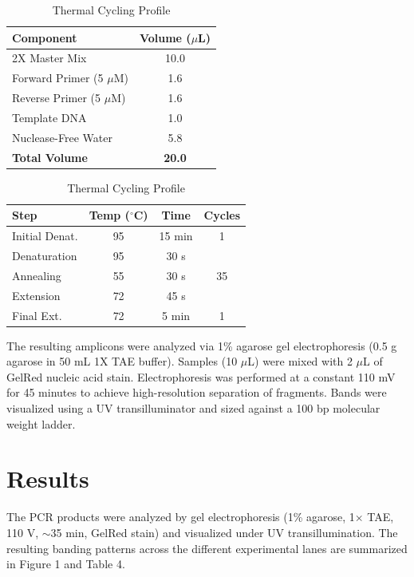 \documentclass[a4paper]{article}
\begin{document}
\begin{table}[h!]
\centering
\begin{minipage}{0.45\textwidth}
\centering
\caption{PCR Reaction Components}
\label{tab:pcr_mix}
\begin{tabular}{@{}lc@{}}
\toprule
\textbf{Component} & \textbf{Volume ($\mu$L)} \\ \midrule
2X Master Mix      & 10.0                     \\
Forward Primer (5 $\mu$M) & 1.6                      \\
Reverse Primer (5 $\mu$M) & 1.6                      \\
Template DNA       & 1.0                      \\
Nuclease-Free Water & 5.8                      \\ \midrule
\textbf{Total Volume} & \textbf{20.0}            \\ \bottomrule
\end{tabular}
\end{minipage}
\hfill
\begin{minipage}{0.45\textwidth}
\centering
\caption{Thermal Cycling Profile}
\label{tab:pcr_cycle}
\begin{tabular}{@{}lccc@{}}
\toprule
\textbf{Step} & \textbf{Temp ($^\circ$C)} & \textbf{Time} & \textbf{Cycles} \\ \midrule
Initial Denat. & 95 & 15 min & 1 \\
Denaturation   & 95 & 30 s   & \\
Annealing      & 55 & 30 s   & 35 \\
Extension      & 72 & 45 s   & \\
Final Ext.     & 72 & 5 min  & 1 \\ \bottomrule
\end{tabular}
\end{minipage}
\end{table}

The resulting amplicons were analyzed via 1\% agarose gel electrophoresis (0.5 g agarose in 50 mL 1X TAE buffer). Samples (10 $\mu$L) were mixed with 2 $\mu$L of GelRed nucleic acid stain. Electrophoresis was performed at a constant 110 mV for 45 minutes to achieve high-resolution separation of fragments. Bands were visualized using a UV transilluminator and sized against a 100 bp molecular weight ladder.

\section{Results}
The PCR products were analyzed by gel electrophoresis (1\% agarose, 1$\times$ TAE, 110 V, $\sim$35 min, GelRed stain) and visualized under UV transillumination. The resulting banding patterns across the different experimental lanes are summarized in Figure 1 and Table 4.
\end{document}
